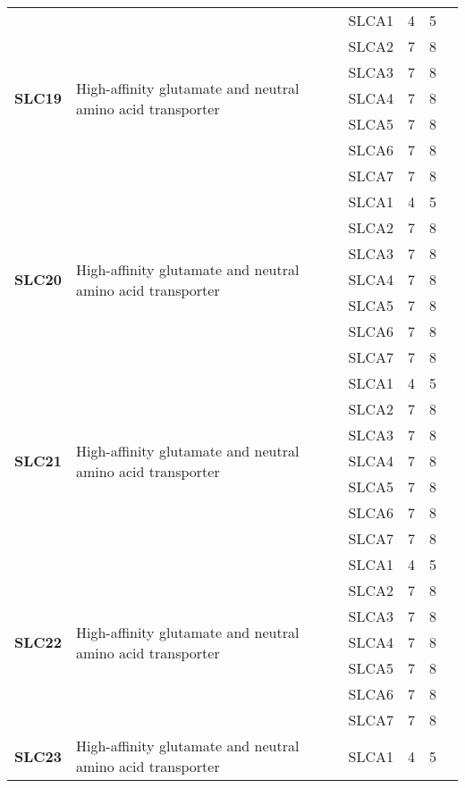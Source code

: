 \documentclass[12pt]{report}
\begin{document}
\begin{center}
\begin{longtable}{|p{1.5cm}|p{3.2cm}|p{1.9cm}|p{1.65cm}|p{3cm}|p{3cm}|}
\multirow{7}{1.5cm}{\textbf{SLC19}} & \multirow{7}{4cm}{High-affinity glutamate and neutral amino acid transporter} & SLCA1 & 4 & 5\\ 
\cline{3-6}
&&SLCA2&7 & 8&\\ 
\cline{3-6}
&&SLCA3&7 & 8&\\ 
\cline{3-6}
&&SLCA4&7 & 8&\\ 
\cline{3-6}
&&SLCA5&7 & 8&\\ 
\cline{3-6}
&&SLCA6&7 & 8&\\ 
\cline{3-6}
&&SLCA7&7 & 8&\\ 
\hline
\multirow{7}{1.5cm}{\textbf{SLC20}} & \multirow{7}{4cm}{High-affinity glutamate and neutral amino acid transporter} & SLCA1 & 4 & 5\\ 
\cline{3-6}
&&SLCA2&7 & 8&\\ 
\cline{3-6}
&&SLCA3&7 & 8&\\ 
\cline{3-6}
&&SLCA4&7 & 8&\\ 
\cline{3-6}
&&SLCA5&7 & 8&\\ 
\cline{3-6}
&&SLCA6&7 & 8&\\ 
\cline{3-6}
&&SLCA7&7 & 8&\\ 
\hline
\multirow{7}{1.5cm}{\textbf{SLC21}} & \multirow{7}{4cm}{High-affinity glutamate and neutral amino acid transporter} & SLCA1 & 4 & 5\\ 
\cline{3-6}
&&SLCA2&7 & 8&\\ 
\cline{3-6}
&&SLCA3&7 & 8&\\ 
\cline{3-6}
&&SLCA4&7 & 8&\\ 
\cline{3-6}
&&SLCA5&7 & 8&\\ 
\cline{3-6}
&&SLCA6&7 & 8&\\ 
\cline{3-6}
&&SLCA7&7 & 8&\\ 
\hline
\multirow{7}{1.5cm}{\textbf{SLC22}} & \multirow{7}{4cm}{High-affinity glutamate and neutral amino acid transporter} & SLCA1 & 4 & 5\\ 
\cline{3-6}
&&SLCA2&7 & 8&\\ 
\cline{3-6}
&&SLCA3&7 & 8&\\ 
\cline{3-6}
&&SLCA4&7 & 8&\\ 
\cline{3-6}
&&SLCA5&7 & 8&\\ 
\cline{3-6}
&&SLCA6&7 & 8&\\ 
\cline{3-6}
&&SLCA7&7 & 8&\\ 
\hline
\multirow{7}{1.5cm}{\textbf{SLC23}} & \multirow{7}{4cm}{High-affinity glutamate and neutral amino acid transporter} & SLCA1 & 4 & 5\\ 

\end{longtable}
\end{center}
\end{document}
